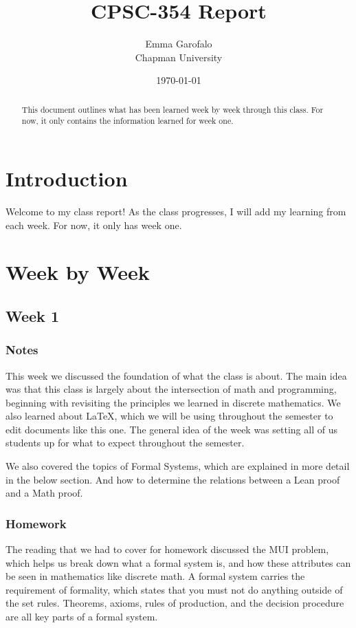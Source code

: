 \documentclass{article}
\title{CPSC-354 Report}
\author{Emma Garofalo  \\ Chapman University}
\date{\today}
\theoremstyle{theorem}
\theoremstyle{definition}
\theoremstyle{remark}
\begin{document}
\maketitle

\begin{abstract}
This document outlines what has been learned week by week through this class. For now, it only contains the information learned for week one.
\end{abstract}

\setcounter{tocdepth}{3}
\tableofcontents

\section{Introduction}\label{intro}
Welcome to my class report! As the class progresses, I will add my learning
from each week. For now, it only has week one. 
\section{Week by Week}\label{homework}

\subsection{Week 1}
\subsubsection*{Notes}
This week we discussed the foundation of what the class is about.
The main idea was that this class is largely about the intersection
of math and programming, beginning with revisiting the principles we learned
in discrete mathematics. We also learned about LaTeX, which we will be using throughout 
the semester to edit documents like this one. The general idea of the week was setting all of us 
students up for what to expect throughout the semester.

We also covered the topics of Formal Systems, which are explained in more detail in the below
section. And how to determine the relations between a Lean proof and a Math proof.
\subsubsection*{Homework}

The reading that we had to cover for homework discussed the MUI problem, which helps us
break down what a formal system is, and how these attributes can be seen in mathematics like 
discrete math. A formal system carries the requirement of formality, which states that you
must not do anything outside of the set rules. Theorems, axioms, rules of production, and the
decision procedure are all key parts of a formal system.
\end{document}
